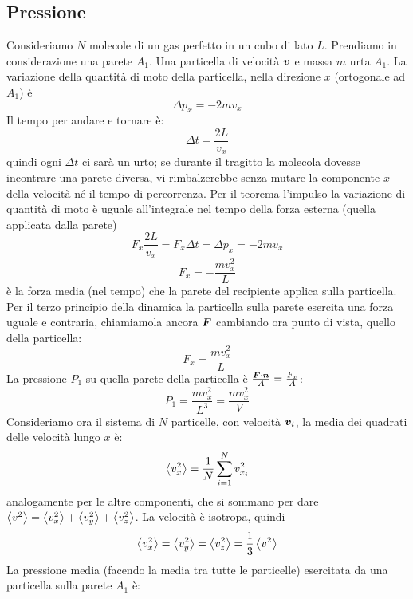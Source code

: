 \subsection{Pressione}
Consideriamo $N$ molecole di un gas perfetto in un cubo di lato $L$. Prendiamo in considerazione una parete $A_1$. Una particella di velocità $\boldsymbol{v}$ e massa $m$ urta $A_1$. La variazione della quantità di moto della particella, nella direzione $x$ (ortogonale ad $A_1$) è
\begin{equation}
   \Delta p_x=-2mv_x
\end{equation}
Il tempo per andare e tornare è:
\begin{equation}
   \Delta t=\frac{2L}{v_x}
\end{equation}
quindi ogni $\Delta t$ ci sarà un urto; se durante il tragitto la molecola dovesse incontrare una parete diversa, vi rimbalzerebbe senza mutare la componente $x$ della velocità né il tempo di percorrenza. Per il teorema l'impulso la variazione di quantità di moto è uguale all'integrale nel tempo della forza esterna (quella applicata dalla parete)
\[
   F_x\frac{2L}{v_x}=F_x\Delta t=\Delta p_x=-2mv_x
\]
\begin{equation}
   F_x=-\frac{mv_x^2}{L}
\end{equation}
è la forza media (nel tempo) che la parete del recipiente applica sulla particella. Per il terzo principio della dinamica la particella sulla parete esercita una forza uguale e contraria, chiamiamola ancora $\boldsymbol{F}$ cambiando ora punto di vista, quello della particella:
\begin{equation}
   F_x=\frac{mv_x^2}{L}
\end{equation}
La pressione $P_1$ su quella parete della particella è $\frac{\boldsymbol{F}\cdot \boldsymbol{n}}{A}=\frac{F_x}{A}$:
\begin{equation}
   P_1=\frac{mv_x^2}{L^3}=\frac{mv_x^2}{V}
\end{equation}
Consideriamo ora il sistema di $N$ particelle, con velocità $\boldsymbol{v}_i$, la media dei quadrati delle velocità lungo $x$ è:
\begin{equation}
   \left<v_x^2\right>=\frac{1}{N}\sum_{i=1}^{N}{v_{x_i}^2}
\end{equation}
analogamente per le altre componenti, che si sommano per dare $\left<v^2\right>=\left<v_x^2\right>+\left<v_y^2\right>+\left<v_z^2\right>$. La velocità è isotropa, quindi
\begin{equation}
   \left<v_x^2\right>=\left<v_y^2\right>=\left<v_z^2\right>=\frac{1}{3}\left<v^2\right>
\end{equation}
La pressione media (facendo la media tra tutte le particelle) esercitata da una particella sulla parete $A_1$ è:
